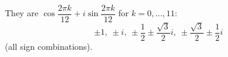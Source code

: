 They are $\cos\dfrac{2\pi k}{12}+i\sin\dfrac{2\pi k}{12}$ for $k=0,\dots,11$:
\[\boxed{\pm1,\ \pm i,\ \pm\dfrac12\pm\dfrac{\sqrt3}2i,\ \pm\dfrac{\sqrt3}2\pm\dfrac12i}\]
(all sign combinations).
